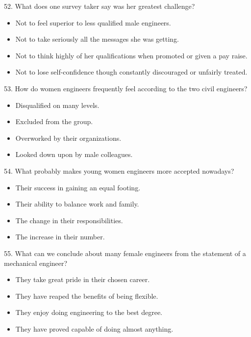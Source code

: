 \documentclass[UTF8,11pt]{ctexart}
\begin{document}
52. What does one survey taker say was her greatest challenge?


\begin{itemize}[leftmargin=2em,itemsep=.2em,topsep=.4em]\item[A.] Not to feel superior to less qualified male engineers.
\item[B.] Not to take seriously all the messages she was getting.
\item[C.] Not to think highly of her qualifications when promoted or given a pay raise.
\item[D.] Not to lose self-confidence though constantly discouraged or unfairly treated.
\end{itemize}

53. How do women engineers frequently feel according to the two civil engineers?


\begin{itemize}[leftmargin=2em,itemsep=.2em,topsep=.4em]\item[A.] Disqualified on many levels.
\item[B.] Excluded from the group.
\item[C.] Overworked by their organizations.
\item[D.] Looked down upon by male colleagues.
\end{itemize}

54. What probably makes young women engineers more accepted nowadays?


\begin{itemize}[leftmargin=2em,itemsep=.2em,topsep=.4em]\item[A.] Their success in gaining an equal footing.
\item[B.] Their ability to balance work and family.
\item[C.] The change in their responsibilities.
\item[D.] The increase in their number.
\end{itemize}

55. What can we conclude about many female engineers from the statement of a mechanical engineer?


\begin{itemize}[leftmargin=2em,itemsep=.2em,topsep=.4em]\item[A.] They take great pride in their chosen career.
\item[B.] They have reaped the benefits of being flexible.
\item[C.] They enjoy doing engineering to the best degree.
\item[D.] They have proved capable of doing almost anything.
\end{itemize}
\end{document}
